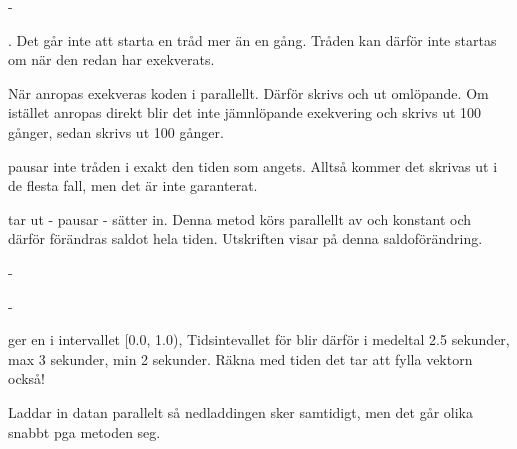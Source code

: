 

\ExerciseSolution{\ExeWeekTWELVE}
                   

\Task     %

\Subtask  -

\Subtask {}. Det går inte att starta en tråd mer än en gång. Tråden kan därför inte startas om när den redan har exekverats.

\Subtask  När  anropas exekveras koden i  parallellt. Därför skrivs  och  ut omlöpande. Om istället  anropas direkt blir det inte jämnlöpande exekvering och  skrivs ut 100 gånger, sedan skrivs  ut 100 gånger.

\Subtask  {} pausar inte tråden i exakt den tiden som angets. Alltså kommer det skrivas ut  i de flesta fall, men det är inte garanterat.


\Task     %

\Subtask {} tar ut - pausar - sätter in. Denna metod körs parallellt av  och  konstant och därför förändras saldot hela tiden. Utskriften visar på denna saldoförändring.

\Task     %

\Task     %

\Subtask

\Subtask

\Subtask

\Subtask

\Task     %

\Subtask -

\Subtask -

\Subtask {} ger en  i intervallet [0.0, 1.0), Tidsintevallet för  blir därför i medeltal 2.5 sekunder, max 3 sekunder, min 2 sekunder. 
Räkna med tiden det tar att fylla vektorn också!

\Subtask

\Subtask

\Subtask Laddar in datan parallelt så nedladdingen sker samtidigt, men det går olika snabbt pga metoden seg.

